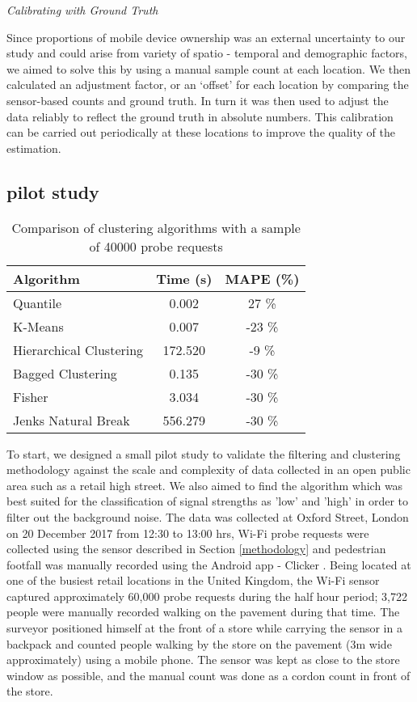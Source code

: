\vspace{1.5em}\noindent\textit{Calibrating with Ground Truth}\vspace{0.5em}

Since proportions of mobile device ownership was an external uncertainty to our study and could arise from variety of spatio - temporal and demographic factors, we aimed to solve this by using a manual sample count at each location.
We then calculated an adjustment factor, or an `offset' for each location by comparing the sensor-based counts and ground truth.
In turn it was then used to adjust the data reliably to reflect the ground truth in absolute numbers.
This calibration can be carried out periodically at these locations to improve the quality of the estimation.


\subsection{pilot study}

\begin{table}
\caption{Comparison of clustering algorithms with a sample of 40000 probe requests}
{\begin{tabular}{lcc} 
	\toprule
	 Algorithm					& Time (s) 	& MAPE (\%) \\
	\midrule
	 Quantile					& 0.002 	&  27 \% \\
	 K-Means			 		& 0.007 	& -23 \% \\
	 Hierarchical Clustering	& 172.520 	&  -9 \% \\
	 Bagged Clustering 			& 0.135 	& -30 \% \\
	 Fisher 					& 3.034 	& -30 \% \\
	 Jenks Natural Break 		& 556.279 	& -30 \% \\
	 \bottomrule
\end{tabular}}
\label{classification-table}
\end{table}

To start, we designed a small pilot study to validate the filtering and clustering methodology against the scale and complexity of data collected in an open public area such as a retail high street.
We also aimed to find the algorithm which was best suited for the classification of signal strengths as 'low' and 'high' in order to filter out the background noise.
The data was collected at Oxford Street, London on 20 December 2017 from 12:30 to 13:00 hrs, Wi-Fi probe requests were collected using the sensor described in Section \ref{methodology} and pedestrian footfall was manually recorded using the Android app - Clicker \citep{bala2018clicker}.
Being located at one of the busiest retail locations in the United Kingdom, the Wi-Fi sensor captured approximately 60,000 probe requests during the half hour period; 3,722 people were manually recorded walking on the pavement during that time.
The surveyor positioned himself at the front of a store while carrying the sensor in a backpack and counted people walking by the store on the pavement (3m wide approximately) using a mobile phone.
The sensor was kept as close to the store window as possible, and the manual count was done as a cordon count in front of the store.

